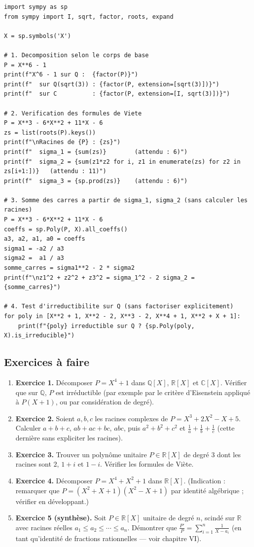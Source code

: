 \documentclass[12pt,a4paper]{report}
\theoremstyle{definition}
\theoremstyle{remark}
\begin{document}
\begin{lstlisting}
import sympy as sp
from sympy import I, sqrt, factor, roots, expand

X = sp.symbols('X')

# 1. Decomposition selon le corps de base
P = X**6 - 1
print(f"X^6 - 1 sur Q :  {factor(P)}")
print(f"  sur Q(sqrt(3)) : {factor(P, extension=[sqrt(3)])}")
print(f"  sur C          : {factor(P, extension=[I, sqrt(3)])}")

# 2. Verification des formules de Viete
P = X**3 - 6*X**2 + 11*X - 6
zs = list(roots(P).keys())
print(f"\nRacines de {P} : {zs}")
print(f"  sigma_1 = {sum(zs)}        (attendu : 6)")
print(f"  sigma_2 = {sum(z1*z2 for i, z1 in enumerate(zs) for z2 in zs[i+1:])}   (attendu : 11)")
print(f"  sigma_3 = {sp.prod(zs)}    (attendu : 6)")

# 3. Somme des carres a partir de sigma_1, sigma_2 (sans calculer les racines)
P = X**3 - 6*X**2 + 11*X - 6
coeffs = sp.Poly(P, X).all_coeffs()
a3, a2, a1, a0 = coeffs
sigma1 = -a2 / a3
sigma2 =  a1 / a3
somme_carres = sigma1**2 - 2 * sigma2
print(f"\nz1^2 + z2^2 + z3^2 = sigma_1^2 - 2 sigma_2 = {somme_carres}")

# 4. Test d'irreductibilite sur Q (sans factoriser explicitement)
for poly in [X**2 + 1, X**2 - 2, X**3 - 2, X**4 + 1, X**2 + X + 1]:
    print(f"{poly} irreductible sur Q ? {sp.Poly(poly, X).is_irreducible}")
\end{lstlisting}

\subsection{Exercices à faire}
\begin{enumerate}
    \item \textbf{Exercice 1.} Décomposer $P = X^4 + 1$ dans $\mathbb{Q}[X]$, $\mathbb{R}[X]$ et $\mathbb{C}[X]$. Vérifier que sur $\mathbb{Q}$, $P$ est irréductible (par exemple par le critère d'Eisenstein appliqué à $P(X+1)$, ou par considération de degré).
    \item \textbf{Exercice 2.} Soient $a, b, c$ les racines complexes de $P = X^3 + 2X^2 - X + 5$. Calculer $a + b + c$, $ab + ac + bc$, $abc$, puis $a^2 + b^2 + c^2$ et $\frac{1}{a} + \frac{1}{b} + \frac{1}{c}$ (cette dernière sans expliciter les racines).
    \item \textbf{Exercice 3.} Trouver un polynôme unitaire $P \in \mathbb{R}[X]$ de degré $3$ dont les racines sont $2$, $1 + i$ et $1 - i$. Vérifier les formules de Viète.
    \item \textbf{Exercice 4.} Décomposer $P = X^4 + X^2 + 1$ dans $\mathbb{R}[X]$. (Indication : remarquer que $P = (X^2 + X + 1)(X^2 - X + 1)$ par identité algébrique ; vérifier en développant.)
    \item \textbf{Exercice 5 (synthèse).} Soit $P \in \mathbb{R}[X]$ unitaire de degré $n$, scindé sur $\mathbb{R}$ avec racines réelles $a_1 \le a_2 \le \cdots \le a_n$. Démontrer que $\frac{P'}{P} = \sum_{i=1}^{n} \frac{1}{X - a_i}$ (en tant qu'identité de fractions rationnelles --- voir chapitre VI).
\end{enumerate}
\end{document}
